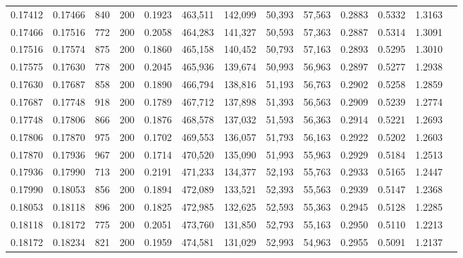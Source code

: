 \begin{tabular}{rrrrrrrrrrrrr}
0.17412 & 0.17466 &   840 & 200 &                                     0.1923 & 463,511 & 142,099 &  50,393 &  57,563 & 0.2883 & 0.5332 & 1.3163 \\
0.17466 & 0.17516 &   772 & 200 &                                     0.2058 & 464,283 & 141,327 &  50,593 &  57,363 & 0.2887 & 0.5314 & 1.3091 \\
0.17516 & 0.17574 &   875 & 200 &                                     0.1860 & 465,158 & 140,452 &  50,793 &  57,163 & 0.2893 & 0.5295 & 1.3010 \\
0.17575 & 0.17630 &   778 & 200 &                                     0.2045 & 465,936 & 139,674 &  50,993 &  56,963 & 0.2897 & 0.5277 & 1.2938 \\
0.17630 & 0.17687 &   858 & 200 &                                     0.1890 & 466,794 & 138,816 &  51,193 &  56,763 & 0.2902 & 0.5258 & 1.2859 \\
0.17687 & 0.17748 &   918 & 200 &                                     0.1789 & 467,712 & 137,898 &  51,393 &  56,563 & 0.2909 & 0.5239 & 1.2774 \\
0.17748 & 0.17806 &   866 & 200 &                                     0.1876 & 468,578 & 137,032 &  51,593 &  56,363 & 0.2914 & 0.5221 & 1.2693 \\
0.17806 & 0.17870 &   975 & 200 &                                     0.1702 & 469,553 & 136,057 &  51,793 &  56,163 & 0.2922 & 0.5202 & 1.2603 \\
0.17870 & 0.17936 &   967 & 200 &                                     0.1714 & 470,520 & 135,090 &  51,993 &  55,963 & 0.2929 & 0.5184 & 1.2513 \\
0.17936 & 0.17990 &   713 & 200 &                                     0.2191 & 471,233 & 134,377 &  52,193 &  55,763 & 0.2933 & 0.5165 & 1.2447 \\
0.17990 & 0.18053 &   856 & 200 &                                     0.1894 & 472,089 & 133,521 &  52,393 &  55,563 & 0.2939 & 0.5147 & 1.2368 \\
0.18053 & 0.18118 &   896 & 200 &                                     0.1825 & 472,985 & 132,625 &  52,593 &  55,363 & 0.2945 & 0.5128 & 1.2285 \\
0.18118 & 0.18172 &   775 & 200 &                                     0.2051 & 473,760 & 131,850 &  52,793 &  55,163 & 0.2950 & 0.5110 & 1.2213 \\
0.18172 & 0.18234 &   821 & 200 &                                     0.1959 & 474,581 & 131,029 &  52,993 &  54,963 & 0.2955 & 0.5091 & 1.2137 \\

\end{tabular}
